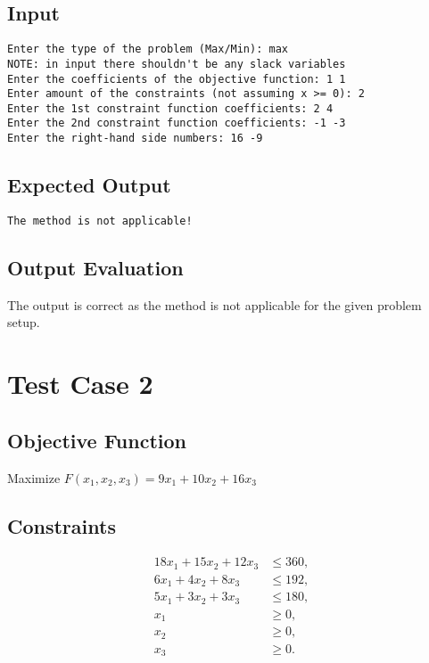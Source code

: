 \documentclass[12pt, legalpaper]{exam}
\begin{document}
\subsection*{Input}
\begin{verbatim}
Enter the type of the problem (Max/Min): max
NOTE: in input there shouldn't be any slack variables
Enter the coefficients of the objective function: 1 1
Enter amount of the constraints (not assuming x >= 0): 2
Enter the 1st constraint function coefficients: 2 4
Enter the 2nd constraint function coefficients: -1 -3
Enter the right-hand side numbers: 16 -9
\end{verbatim}
 
\subsection*{Expected Output}
\begin{verbatim}
The method is not applicable!
\end{verbatim}
 
\subsection*{Output Evaluation}
The output is correct as the method is not applicable for the given problem setup.
 
\section*{Test Case 2}
 
\subsection*{Objective Function}
Maximize \( F(x_1, x_2, x_3) = 9x_1 + 10x_2 + 16x_3 \)
 
\subsection*{Constraints}
\begin{align*}
    18x_1 + 15x_2 + 12x_3 &\leq 360, \\
    6x_1 + 4x_2 + 8x_3 &\leq 192, \\
    5x_1 + 3x_2 + 3x_3 &\leq 180, \\
    x_1 &\geq 0, \\
    x_2 &\geq 0, \\
    x_3 &\geq 0.
\end{align*}
 
\end{document}
